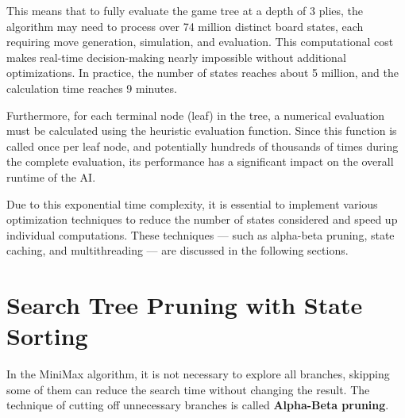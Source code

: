 This means that to fully evaluate the game tree at a depth of 3 plies, the algorithm may need to process over 74 million distinct board states, each requiring move generation, simulation, and evaluation. This computational cost makes real-time decision-making nearly impossible without additional optimizations. In practice, the number of states reaches about 5 million, and the calculation time reaches 9 minutes.

Furthermore, for each terminal node (leaf) in the tree, a numerical evaluation must be calculated using the heuristic evaluation function. Since this function is called once per leaf node, and potentially hundreds of thousands of times during the complete evaluation, its performance has a significant impact on the overall runtime of the AI.

Due to this exponential time complexity, it is essential to implement various optimization techniques to reduce the number of states considered and speed up individual computations. These techniques — such as alpha-beta pruning, state caching, and multithreading — are discussed in the following sections.

\section{Search Tree Pruning with State Sorting}

In the MiniMax algorithm, it is not necessary to explore all branches, skipping some of them can reduce the search time without changing the result. The technique of cutting off unnecessary branches is called \textbf{Alpha-Beta pruning}. \cite[Section 5.3]{russel2010}

